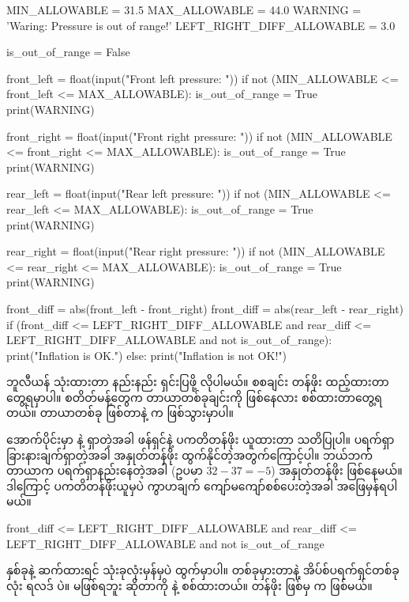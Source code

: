 %
%
\begin{py}
MIN_ALLOWABLE = 31.5
MAX_ALLOWABLE = 44.0
WARNING = 'Waring: Pressure is out of range!'
LEFT_RIGHT_DIFF_ALLOWABLE = 3.0

is_out_of_range = False

front_left = float(input("Front left pressure: "))
if not (MIN_ALLOWABLE <= front_left <= MAX_ALLOWABLE):
    is_out_of_range = True
    print(WARNING)

front_right = float(input("Front right pressure: "))
if not (MIN_ALLOWABLE <= front_right <= MAX_ALLOWABLE):
    is_out_of_range = True
    print(WARNING)

rear_left = float(input("Rear left pressure: "))
if not (MIN_ALLOWABLE <= rear_left <= MAX_ALLOWABLE):
    is_out_of_range = True
    print(WARNING)

rear_right = float(input("Rear right pressure: "))
if not (MIN_ALLOWABLE <= rear_right <= MAX_ALLOWABLE):
    is_out_of_range = True
    print(WARNING)

front_diff = abs(front_left - front_right)
front_diff = abs(rear_left - rear_right)
if (front_diff <= LEFT_RIGHT_DIFF_ALLOWABLE
        and rear_diff <= LEFT_RIGHT_DIFF_ALLOWABLE
        and not is_out_of_range):
    print("Inflation is OK.")
else:
    print("Inflation is not OK!")

\end{py}
%

 ဘူလီယန် သုံးထားတာ နည်းနည်း ရှင်းပြဖို့ လိုပါမယ်။ စစချင်း  တန်ဖိုး ထည့်ထားတာ တွေ့ရမှာပါ။  စတိတ်မန့်တွေက တာယာတစ်ခုချင်းကို  ဖြစ်နေလား စစ်ထားတာတွေ့ရတယ်။ တာယာတစ်ခု  ဖြစ်တာနဲ့  က  ဖြစ်သွားမှာပါ။ 

အောက်ပိုင်းမှာ  နဲ့  ရှာတဲ့အခါ  ဖန်ရှင်နဲ့ ပကတိတန်ဖိုး ယူထားတာ သတိပြုပါ။ ပရက်ရှာ ခြားနားချက်ရှာတဲ့အခါ အနှုတ်တန်ဖိုး ထွက်နိုင်တဲ့အတွက်ကြောင့်ပါ။ ဘယ်ဘက်တာယာက ပရက်ရှာနည်းနေတဲ့အခါ (ဥပမာ \(32 - 37 = -5\))  အနှုတ်တန်ဖိုး ဖြစ်နေမယ်။ ဒါကြောင့် ပကတိတန်ဖိုးယူမှပဲ ကွာဟချက်  ကျော်မကျော်စစ်ပေးတဲ့အခါ အဖြေမှန်ရပါမယ်။ 
%
\begin{py}
front_diff <= LEFT_RIGHT_DIFF_ALLOWABLE
    and rear_diff <= LEFT_RIGHT_DIFF_ALLOWABLE
    and not is_out_of_range
\end{py}
%
 နှစ်ခုနဲ့ ဆက်ထားရင် သုံးခုလုံးမှန်မှပဲ  ထွက်မှာပါ။ တစ်ခုမှားတာနဲ့ အိပ်စ်ပရက်ရှင်တစ်ခုလုံး ရလဒ်  ပဲ။  မဖြစ်ရဘူး ဆိုတာကို  နဲ့ စစ်ထားတယ်။  တန်ဖိုး  ဖြစ်မှ  က  ဖြစ်မယ်။